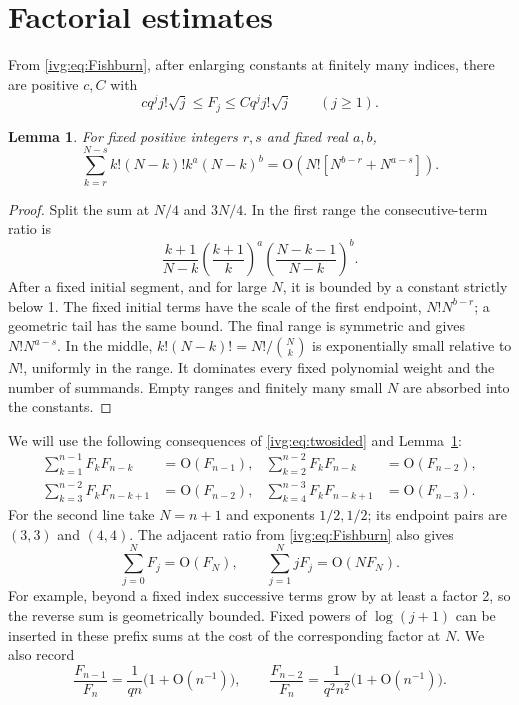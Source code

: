 \documentclass[11pt,letterpaper]{article}
\newtheorem{lemma}[theorem]{Lemma}
\theoremstyle{definition}\newtheorem{definition}[theorem]{Definition}
\theoremstyle{remark}\newtheorem{remark}[theorem]{Remark}
\newcommand{\OO}{\mathrm O}
\begin{document}
\section{Factorial estimates}\label{ivg:sec:factorial}
From \eqref{ivg:eq:Fishburn}, after enlarging constants at finitely many indices, there are positive $c,C$ with
\begin{equation}\label{ivg:eq:twosided}
 c q^j j!\sqrt j\le F_j\le Cq^j j!\sqrt j\qquad(j\ge1).
\end{equation}
\begin{lemma}\label{ivg:lem:convolution}
For fixed positive integers $r,s$ and fixed real $a,b$,
\begin{equation}\label{ivg:eq:convolution}
 \sum_{k=r}^{N-s} k!(N-k)!k^a(N-k)^b
 =\OO\!\left(N!\left[N^{b-r}+N^{a-s}\right]\right).
\end{equation}
\end{lemma}
\begin{proof}
Split the sum at $N/4$ and $3N/4$. In the first range the consecutive-term ratio is
\[
 \frac{k+1}{N-k}\left(\frac{k+1}{k}\right)^a
 \left(\frac{N-k-1}{N-k}\right)^b.
\]
After a fixed initial segment, and for large $N$, it is bounded by a constant strictly below 1. The fixed initial terms have the scale of the first endpoint, $N!N^{b-r}$; a geometric tail has the same bound. The final range is symmetric and gives $N!N^{a-s}$. In the middle, $k!(N-k)!=N!/\binom Nk$ is exponentially small relative to $N!$, uniformly in the range. It dominates every fixed polynomial weight and the number of summands. Empty ranges and finitely many small $N$ are absorbed into the constants.
\end{proof}
We will use the following consequences of \eqref{ivg:eq:twosided} and Lemma~\ref{ivg:lem:convolution}:
\begin{align}
 \sum_{k=1}^{n-1}F_kF_{n-k}&=\OO(F_{n-1}),&
 \sum_{k=2}^{n-2}F_kF_{n-k}&=\OO(F_{n-2}),\label{ivg:eq:conv12}\\
 \sum_{k=3}^{n-2}F_kF_{n-k+1}&=\OO(F_{n-2}),&
 \sum_{k=4}^{n-3}F_kF_{n-k+1}&=\OO(F_{n-3}).\label{ivg:eq:conv34}
\end{align}
For the second line take $N=n+1$ and exponents $1/2,1/2$; its endpoint pairs are $(3,3)$ and $(4,4)$. The adjacent ratio from \eqref{ivg:eq:Fishburn} also gives
\begin{equation}\label{ivg:eq:prefix}
 \sum_{j=0}^{N}F_j=\OO(F_N),\qquad
 \sum_{j=1}^{N}jF_j=\OO(NF_N).
\end{equation}
For example, beyond a fixed index successive terms grow by at least a factor 2, so the reverse sum is geometrically bounded. Fixed powers of $\log(j+1)$ can be inserted in these prefix sums at the cost of the corresponding factor at $N$. We also record
\begin{equation}\label{ivg:eq:ratios}
 \frac{F_{n-1}}{F_n}=\frac1{qn}\bigl(1+\OO(n^{-1})\bigr),\qquad
 \frac{F_{n-2}}{F_n}=\frac1{q^2n^2}\bigl(1+\OO(n^{-1})\bigr).
\end{equation}
\end{document}
